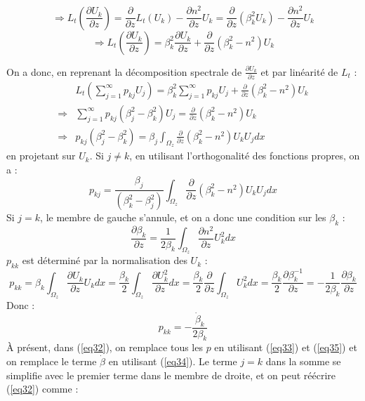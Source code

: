 \documentclass{article}
\begin{document}
\[\Rightarrow L_t\left( \frac{\partial U_k}{\partial z}\right)= \frac{\partial}{\partial z} L_t(U_k)-\frac{\partial n^2}{\partial z}U_k=\frac{\partial}{\partial z} (\beta_k^2U_k)-\frac{\partial n^2}{\partial z}U_k\]
\[\Rightarrow L_t\left( \frac{\partial U_k}{\partial z}\right)= \beta_k^2\frac{\partial U_k}{\partial z} + \frac{\partial}{\partial z}(\beta_k^2-n^2)U_k\]

On a donc, en reprenant la décomposition spectrale de $\frac{\partial U_k}{\partial z}$ et par linéarité de $L_t$ :
\begin{eqnarray*}
&L_t\left( \sum_{j=1}^\infty p_{kj}U_j\right)=\beta_k^2\sum_{j=1}^\infty p_{kj}U_j + \frac{\partial}{\partial z}(\beta_k^2-n^2)U_k\\
\Rightarrow& \sum_{j=1}^\infty p_{kj}(\beta_j^2-\beta_k^2)U_j=\frac{\partial}{\partial z}(\beta_k^2-n^2)U_k\\
\Rightarrow& p_{kj}(\beta_j^2-\beta_k^2)=\beta_j\int_{\Omega_z}\frac{\partial}{\partial z}(\beta_k^2-n^2)U_kU_j dx
\end{eqnarray*}
en projetant sur $U_k$. Si $j\neq k$, en utilisant l'orthogonalité des fonctions propres, on a :
\begin{equation}\label{eq33}
	p_{kj}=\frac{\beta_j}{(\beta_k^2-\beta_j^2)}\int_{\Omega_z}\frac{\partial}{\partial z}(\beta_k^2-n^2)U_kU_j dx
\end{equation}
Si $j=k$, le membre de gauche s'annule, et on a donc une condition sur les $\beta_k$ :
\begin{equation}\label{eq34}
	\frac{\partial \beta_k}{\partial z}=\frac{1}{2\beta_k}\int_{\Omega_z} \frac{\partial n^2}{\partial z}U_k^2 dx
\end{equation}
$p_{kk}$ est déterminé par la normalisation des $U_k$ :
\[p_{kk}=\beta_k\int_{\Omega_z} \frac{\partial U_k}{\partial z}U_kdx=\frac{\beta_k}{2}\int_{\Omega_z} \frac{\partial U_k^2}{\partial z}dx=\frac{\beta_k}{2}\frac{\partial}{\partial z}\int_{\Omega_z} U_k^2dx = \frac{\beta_k}{2}\frac{\partial \beta_k^{-1}}{\partial z}=-\frac{1}{2\beta_k}\frac{\partial \beta_k}{\partial z}\]
Donc : \begin{equation}\label{eq35} p_{kk}=-\frac{\dot{\beta}_k}{2\beta_k} \end{equation}
À présent, dans (\ref{eq32}), on remplace tous les $p$ en utilisant (\ref{eq33}) et (\ref{eq35}) et on remplace le terme $\dot{\beta}$ en utilisant (\ref{eq34}). Le terme $j=k$ dans la somme se simplifie avec le premier terme dans le membre de droite, et on peut réécrire (\ref{eq32}) comme :
\end{document}
